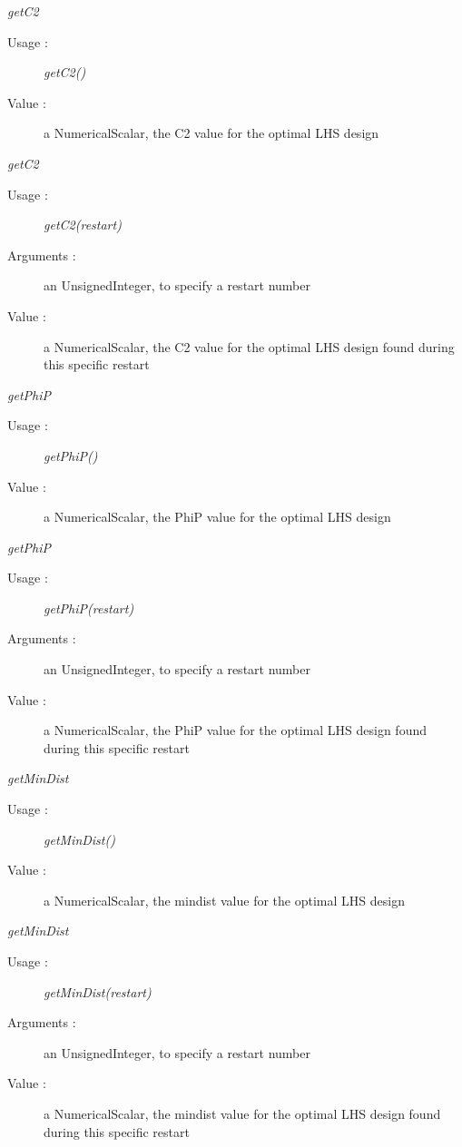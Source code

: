 \begin{description}
\item \textit{getC2}
  \begin{description}
  \item[Usage :] \textit{getC2()}
  \item[Value :] a NumericalScalar, the C2 value for the optimal LHS design
  \end{description}

\item \textit{getC2}
  \begin{description}
  \item[Usage :] \textit{getC2(restart)}
  \item[Arguments :] an UnsignedInteger, to specify a restart number
  \item[Value :] a NumericalScalar, the C2 value for the optimal LHS design found during this specific restart
  \end{description}

\item \textit{getPhiP}
  \begin{description}
  \item[Usage :] \textit{getPhiP()}
  \item[Value :] a NumericalScalar, the PhiP value for the optimal LHS design
  \end{description}

\item \textit{getPhiP}
  \begin{description}
  \item[Usage :] \textit{getPhiP(restart)}
  \item[Arguments :] an UnsignedInteger, to specify a restart number
  \item[Value :] a NumericalScalar, the PhiP value for the optimal LHS design found during this specific restart
  \end{description}

\item \textit{getMinDist}
  \begin{description}
  \item[Usage :] \textit{getMinDist()}
  \item[Value :] a NumericalScalar, the mindist value for the optimal LHS design
  \end{description}

\item \textit{getMinDist}
  \begin{description}
  \item[Usage :] \textit{getMinDist(restart)}
  \item[Arguments :] an UnsignedInteger, to specify a restart number
  \item[Value :] a NumericalScalar, the mindist value for the optimal LHS design found during this specific restart
  \end{description}

\end{description}


